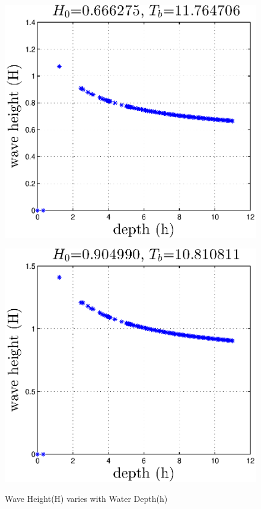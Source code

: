 \begin{figure}[H]
\begin{minipage}[b]{0.47\linewidth}
\centering
\includegraphics[width=\textwidth]{forward_plot/p1_5.eps}
\label{FigH_1}
\end{minipage}
\hspace{0.2cm}
\begin{minipage}[b]{0.47\linewidth}
\centering
\includegraphics[width=\textwidth]{forward_plot/p2_5.eps}
\label{FigH_2}
\end{minipage}
\caption{Wave Height(H) varies with Water Depth(h)}
\end{figure}

